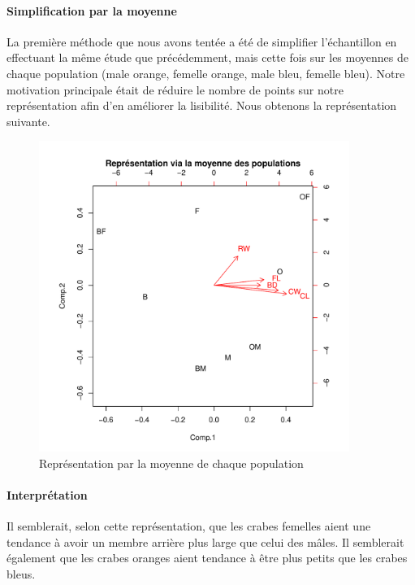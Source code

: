 \documentclass{report}
\begin{document}
\paragraph{Simplification par la moyenne}
La première méthode que nous avons tentée a été de simplifier l'échantillon en effectuant la même étude que précédemment, mais cette fois sur les moyennes de chaque population (male orange, femelle orange, male bleu, femelle bleu). Notre motivation principale était de réduire le nombre de points sur notre représentation afin d'en améliorer la lisibilité.
Nous obtenons la représentation suivante.
\begin{figure}[h!]
\begin{center}
    \includegraphics[width=0.9\textwidth]{crabsmean.pdf}
    \caption{Représentation par la moyenne de chaque population}
\end{center}
\end{figure}
\paragraph{Interprétation}
Il semblerait, selon cette représentation, que les crabes femelles aient une tendance à avoir un membre arrière plus large que celui des mâles. Il semblerait également que les crabes oranges aient tendance à être plus petits que les crabes bleus.
\end{document}
